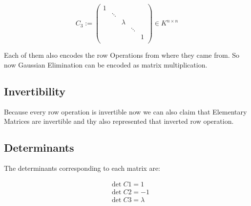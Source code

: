 \[
       C_3 := 
       \begin{pmatrix}
       1      &        &        &        &        \\
              & \ddots &        &        &        \\
              &        & \lambda &       &        \\
              &        &        & \ddots &        \\
              &        &        &        & 1      \\
       \end{pmatrix}
       \in K^{n \times n}
\]

Each of them also encodes the row Operations from where they came from.
So now Gaussian Elimination can be encoded as matrix multiplication.

\subsection{Invertibility}

Because every row operation is invertible now we can also claim that
Elementary Matrices are invertible and thy also represented that inverted row operation.

\subsection{Determinants}

The determinants corresponding to each matrix are:

\begin{align*}
&\det C1 = 1\\
&\det C2 = -1\\
&\det C3 = \lambda
\end{align*}

